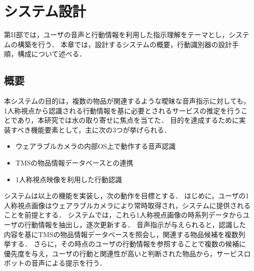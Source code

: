 \chapter{システム設計}
第II部では，ユーザの音声と行動情報を利用した指示理解をテーマとし，システムの構築を行う．
本章では，設計するシステムの概要，行動識別器の設計手順，構成について述べる．

\section{概要}
本システムの目的は，複数の物品が関連するような曖昧な音声指示に対しても，1人称視点から認識される行動情報を基に必要とされるサービスの推定を行うことであり，本研究では水の取り寄せに焦点を当てた．
目的を達成するために実装すべき機能要素として，主に次の3つが挙げられる．
\begin{itemize}
\setlength{\itemsep}{-5pt}
\item{ウェアラブルカメラの内部OS上で動作する音声認識}
\item{TMSの物品情報データベースとの連携}
\item{1人称視点映像を利用した行動認識}
\end{itemize}

システムは以上の機能を実装し，次の動作を目標とする．
はじめに，ユーザの1人称視点画像はウェアラブルカメラにより常時取得され，システムに提供されることを前提とする．
システムでは，これら1人称視点画像の時系列データからユーザの行動情報を抽出し，逐次更新する．
音声指示が与えられると，認識した内容を基にTMSの物品情報データベースを照会し，関連する物品候補を複数列挙する．
さらに，その時点のユーザの行動情報を参照することで複数の候補に優先度を与え，ユーザの行動と関連性が高いと判断された物品から，サービスロボットの音声による提示を行う．

